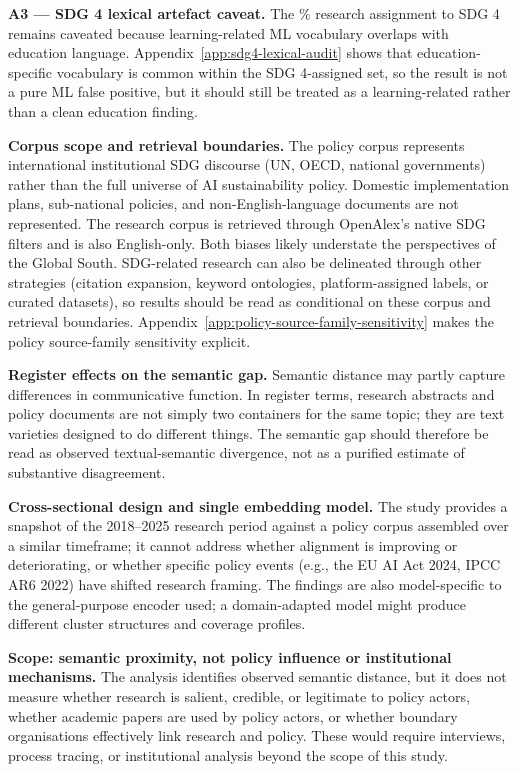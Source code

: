 \documentclass[12pt,a4paper]{article}
\begin{document}
\textbf{A3 --- SDG 4 lexical artefact caveat.} The \ResearchPctSdgFour\% research assignment to SDG 4 remains caveated because learning-related ML vocabulary overlaps with education language. Appendix~\ref{app:sdg4-lexical-audit} shows that education-specific vocabulary is common within the SDG 4-assigned set, so the result is not a pure ML false positive, but it should still be treated as a learning-related rather than a clean education finding.

\textbf{Corpus scope and retrieval boundaries.} The policy corpus represents international institutional SDG discourse (UN, OECD, national governments) rather than the full universe of AI sustainability policy. Domestic implementation plans, sub-national policies, and non-English-language documents are not represented. The research corpus is retrieved through OpenAlex's native SDG filters and is also English-only. Both biases likely understate the perspectives of the Global South. SDG-related research can also be delineated through other strategies (citation expansion, keyword ontologies, platform-assigned labels, or curated datasets), so results should be read as conditional on these corpus and retrieval boundaries. Appendix~\ref{app:policy-source-family-sensitivity} makes the policy source-family sensitivity explicit.

\textbf{Register effects on the semantic gap.} Semantic distance may partly capture differences in communicative function. In register terms, research abstracts and policy documents are not simply two containers for the same topic; they are text varieties designed to do different things. The semantic gap should therefore be read as observed textual-semantic divergence, not as a purified estimate of substantive disagreement.

\textbf{Cross-sectional design and single embedding model.} The study provides a snapshot of the 2018--2025 research period against a policy corpus assembled over a similar timeframe; it cannot address whether alignment is improving or deteriorating, or whether specific policy events (e.g., the EU AI Act 2024, IPCC AR6 2022) have shifted research framing. The findings are also model-specific to the general-purpose encoder used; a domain-adapted model might produce different cluster structures and coverage profiles.

\textbf{Scope: semantic proximity, not policy influence or institutional mechanisms.} The analysis identifies observed semantic distance, but it does not measure whether research is salient, credible, or legitimate to policy actors, whether academic papers are used by policy actors, or whether boundary organisations effectively link research and policy. These would require interviews, process tracing, or institutional analysis beyond the scope of this study.
\end{document}
